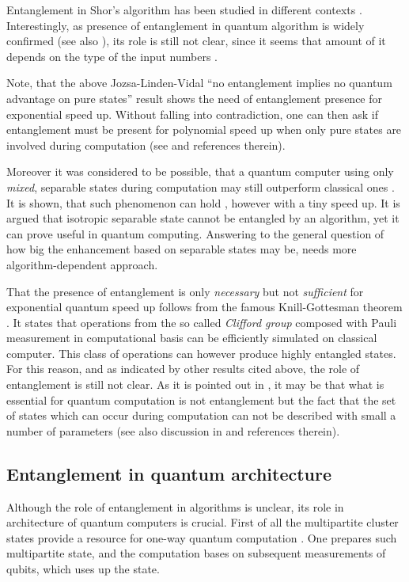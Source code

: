 \documentclass[twocolumn,aps,rmp]{revtex4}
\begin{document}
Entanglement in Shor's algorithm has been studied in different
contexts
\cite{EkertJozsa,JozsaLinden,ParkerPlenio,ShimoniShapiraBiham}.
Interestingly, as presence of entanglement in quantum algorithm is
widely confirmed (see also
\cite{AdattaV_ent_mixed_comp2006,ADattaFCC_1q_comp2005}), its role is
still not clear, since it seems that amount of it depends on the type
of the input numbers \cite{KendonMunro}.

Note, that the above Jozsa-Linden-Vidal ``no entanglement implies no
quantum advantage on pure states'' result shows the need of
entanglement presence for exponential speed up. Without falling into
contradiction, one can then ask if entanglement must be present for
polynomial speed up when only pure states are involved during
computation (see \cite{KenigsbergMoreRatsaby} and references
therein).

Moreover it was considered to be possible, that a quantum computer
using only {\it mixed}, separable states during computation may
still outperform classical ones \cite{JozsaLinden}. It is shown,
that such phenomenon can hold \cite{Tal1}, however with a tiny speed
up. It is argued that isotropic separable state cannot be entangled
by an algorithm, yet it can prove useful in quantum computing.
Answering to the general question of how big the enhancement
based on separable states may be, needs more algorithm-dependent
approach.

That the presence of entanglement is only {\it necessary} but not
{\it sufficient} for exponential quantum speed up follows from the
famous Knill-Gottesman theorem \cite{GottesmanC1999-Knill,JozsaLinden}.
It states that operations from the so called {\it
Clifford group} composed with Pauli measurement in
computational basis can be efficiently simulated on
classical computer. This class of operations can however produce
highly entangled states. For this reason, and as indicated by other
results cited above, the role of entanglement is still not
clear. As it is pointed out in \cite{JozsaLinden}, it may be that
what is essential for quantum computation is not entanglement but
the fact that the set of states which can occur during computation
can not be described with small a number of parameters
(see also discussion in \cite{Knill-ent-comp2001} and
references therein).

\subsection{Entanglement in quantum architecture}
Although the role of entanglement in algorithms is unclear,
its role in architecture of quantum computers is crucial. First of
all the multipartite cluster states provide a resource for one-way
quantum computation
\cite{RaussendorfBriegelOneWay}. One
prepares such multipartite state, and the computation bases on
subsequent measurements of qubits, which uses up the state.
\end{document}
